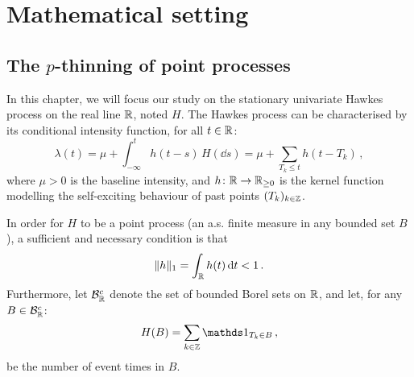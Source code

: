 
\section{Mathematical setting}\label{sec:chap5_mathsetting}

\subsection{The $p$-thinning of point processes}\label{sec:chap5_hawkesprocess}

In this chapter, we will focus our study on the stationary univariate Hawkes process on the real line ${\mathbb R}$, noted $H$.
The Hawkes process can be characterised by its conditional intensity function, for all $t\in{\mathbb R}$:
\begin{equation}\label{eq:chap5_hawkes_intensity}
    \lambda(t) = \mu + \int_{-\infty}^{t}{h(t-s)\,H(\dd s)} = \mu + \sum_{T_k \leq t}{h(t-T_k)}\,,
\end{equation}
where $\mu > 0$ is the baseline intensity, and $h\colon{\mathbb R}\to {\mathbb R}_{\geq 0}$ is the kernel function modelling the self-exciting behaviour of past points $(T_k)_{k\in{\mathbb Z}}$.

In order for $H$ to be a point process (\ie an a.s. finite measure in any bounded set $B$), 
a sufficient and necessary condition \parencite{Hawkes1971} is that 
\[\|h\|_1 = \int_{{\mathbb R}}{h(t)\,{\mathrm{d}} t} < 1\,.\]
Furthermore, let $\mathcal{B}_{{\mathbb R}}^c$ denote the set of bounded Borel sets on ${\mathbb R}$, and let, for any $B\in\mathcal{B}_{{\mathbb R}}^c$:
\[H(B) = \sum_{k\in\ZZ}{\II_{T_k \in B}}\,,\]
be the number of event times in $B$. 


